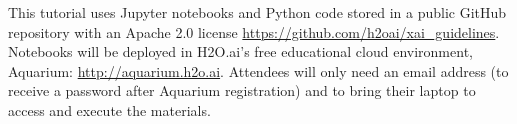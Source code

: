 \documentclass[sigconf]{acmart}
\begin{document}
This tutorial uses Jupyter notebooks and Python code stored in a public GitHub repository with an Apache 2.0 license \url{https://github.com/h2oai/xai_guidelines}. Notebooks will be deployed in H2O.ai's free educational cloud environment, Aquarium: \url{http://aquarium.h2o.ai}. Attendees will only need an email address (to receive a password after Aquarium registration) and to bring their laptop to access and execute the materials. 



\clearpage
\footnotesize

\end{document}
